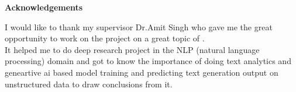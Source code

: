 \begin{flushright}
\huge{\textbf{Acknowledgements}}
\end{flushright}
I would like to thank my supervisor Dr.Amit Singh who gave me the great opportunity to work on the project on a great topic of \ttitle{}. 
\\
It helped me to do deep research project in the NLP (natural language processing) domain and got to know the importance of doing text analytics and geneartive ai based model training and predicting text generation output on unstructured data to draw conclusions from it.